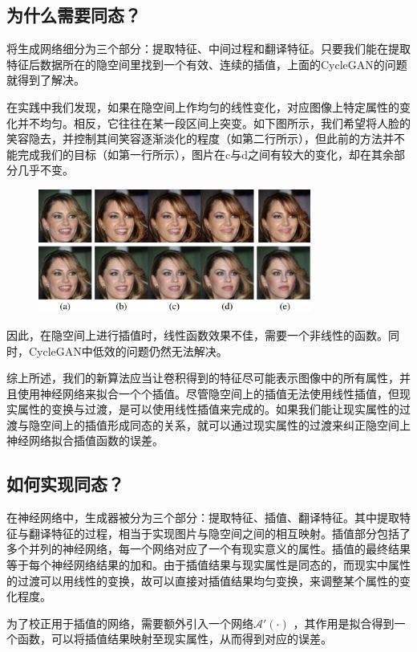 \documentclass[UTF8,a4paper，12pt]{article}
\def\MC {\mathcal}
\theoremstyle{theorem}
\theoremstyle{definition}
\begin{document}
\subsection{为什么需要同态？}

将生成网络细分为三个部分：提取特征、中间过程和翻译特征。只要我们能在提取特征后数据所在的隐空间里找到一个有效、连续的插值，上面的CycleGAN的问题就得到了解决。

在实践中我们发现，如果在隐空间上作均匀的线性变化，对应图像上特定属性的变化并不均匀。相反，它往往在某一段区间上突变。如下图所示，我们希望将人脸的笑容隐去，并控制其间笑容逐渐淡化的程度（如第二行所示），但此前的方法并不能完成我们的目标（如第一行所示），图片在c与d之间有较大的变化，却在其余部分几乎不变。

\begin{figure}[htbp]
	\centering
	\includegraphics[width=0.8\textwidth]{assets/11}
	\caption{}
\end{figure}
因此，在隐空间上进行插值时，线性函数效果不佳，需要一个非线性的函数。同时，CycleGAN中低效的问题仍然无法解决。

综上所述，我们的新算法应当让卷积得到的特征尽可能表示图像中的所有属性，并且使用神经网络来拟合一个个插值。尽管隐空间上的插值无法使用线性插值，但现实属性的变换与过渡，是可以使用线性插值来完成的。如果我们能让现实属性的过渡与隐空间上的插值形成同态的关系，就可以通过现实属性的过渡来纠正隐空间上神经网络拟合插值函数的误差。

\subsection{如何实现同态？}

在神经网络中，生成器被分为三个部分：提取特征、插值、翻译特征。其中提取特征与翻译特征的过程，相当于实现图片与隐空间之间的相互映射。插值部分包括了多个并列的神经网络，每一个网络对应了一个有现实意义的属性。插值的最终结果等于每个神经网络结果的加和。由于插值结果与现实属性是同态的，而现实中属性的过渡可以用线性的变换，故可以直接对插值结果均匀变换，来调整某个属性的变化程度。

为了校正用于插值的网络，需要额外引入一个网络$\MC A'(\cdot)$ ，其作用是拟合得到一个函数，可以将插值结果映射至现实属性，从而得到对应的误差。
\end{document}
